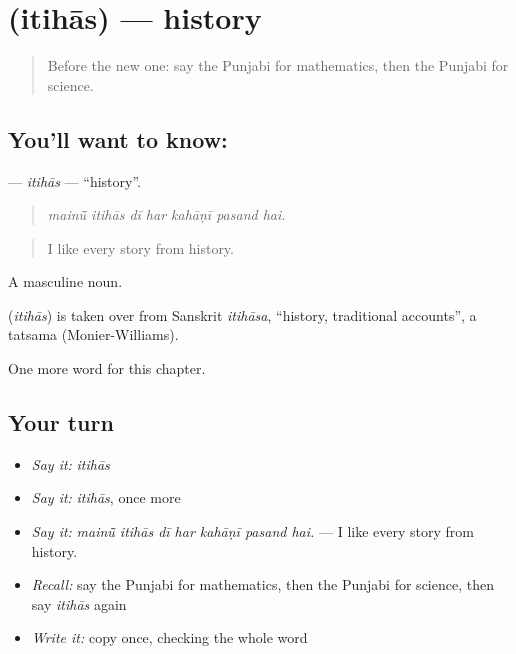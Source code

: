 \section[\texorpdfstring{\pa{ਇਤਿਹਾਸ} (itihās)}{ਇਤਿਹਾਸ (itihās)}]{ (itihās) — history}

\label{lesson:PA-C358-itihas}



\begin{quote}
Before the new one: say the Punjabi for mathematics, then the Punjabi for science.
\end{quote}

\subsection*{You'll want to know: }
\textbf{} — \emph{itihās} — \textquotedblleft{}history\textquotedblright{}.

\begin{quote}
      
\end{quote}

\begin{quote}
\emph{mainū̃ itihās dī har kahāṇī pasand hai.}
\end{quote}

\begin{quote}
I like every story from history.
\end{quote}

A masculine noun.

\begin{cousinweb}
\textbf{} (\emph{itihās}) is taken over from Sanskrit \emph{itihāsa}, \textquotedblleft{}history, traditional accounts\textquotedblright{}, a tatsama (Monier-Williams).
\end{cousinweb}

\begin{grammarlens}[title={What you've built}]
One more word for this chapter.
\end{grammarlens}

\subsection*{Your turn}
\begin{itemize}
\raggedright
  \item \emph{Say it:} \emph{itihās}
  \item \emph{Say it:} \emph{itihās}, once more
  \item \emph{Say it:} \emph{mainū̃ itihās dī har kahāṇī pasand hai.} — I like every story from history.
  \item \emph{Recall:} say the Punjabi for mathematics, then the Punjabi for science, then say \emph{itihās} again
  \item \emph{Write it:} copy \textbf{} once, checking the whole word
\end{itemize}


